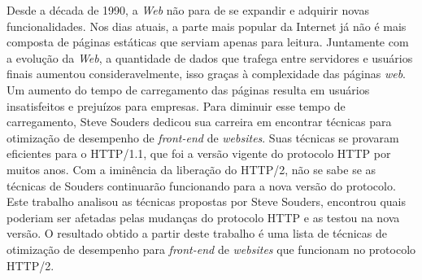%
%

\begin{resumo}

Desde a década de 1990, a \textit{Web} não para de se expandir e adquirir novas funcionalidades. Nos dias atuais, a parte mais popular da Internet já não é mais composta de páginas estáticas que serviam apenas para leitura. Juntamente com a evolução da \textit{Web}, a quantidade de dados que trafega entre servidores e usuários finais aumentou consideravelmente, isso graças à complexidade das páginas \textit{web}. Um aumento do tempo de carregamento das páginas resulta em usuários insatisfeitos e prejuízos para empresas. Para diminuir esse tempo de carregamento, Steve Souders dedicou sua carreira em encontrar técnicas para otimização de desempenho de \textit{front-end} de \textit{websites}. Suas técnicas se provaram eficientes para o HTTP/1.1, que foi a versão vigente do protocolo HTTP por muitos anos. Com a iminência da liberação do HTTP/2, não se sabe se as técnicas de Souders continuarão funcionando para a nova versão do protocolo. Este trabalho analisou as técnicas propostas por Steve Souders, encontrou quais poderiam ser afetadas pelas mudanças do protocolo HTTP e as testou na nova versão. O resultado obtido a partir deste trabalho é uma lista de técnicas de otimização de desempenho para \textit{front-end} de \textit{websites} que funcionam no protocolo HTTP/2.

\end{resumo}
